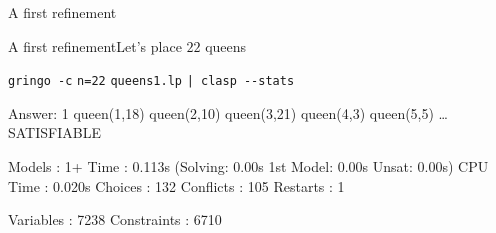 \begin{frame}[fragile]{A first refinement}{
    \alert<4>{}
    }
\end{frame}
\begin{frame}[fragile]{A first refinement}{Let's place \alert{$22$} queens}
\begin{block}{\alert<1>{\lstinline{gringo -c} \alert{\lstinline{n=22}} \lstinline{queens1.lp} \lstinline{| clasp --stats}}}
\pause\footnotesize%
\begin{semiverbatim}
Answer: 1
queen(1,18) queen(2,10) queen(3,21) queen(4,3) queen(5,5) \dots{}
SATISFIABLE

Models      : 1+
\alert<2>{Time        : 0.113s} (Solving: 0.00s 1st Model: 0.00s Unsat: 0.00s)
CPU Time    : 0.020s
\alert<2>{Choices     : 132}
\alert<2>{Conflicts   : 105}
Restarts    : 1

Variables   : 7238
Constraints : 6710
\end{semiverbatim}
\end{block}
\end{frame}
